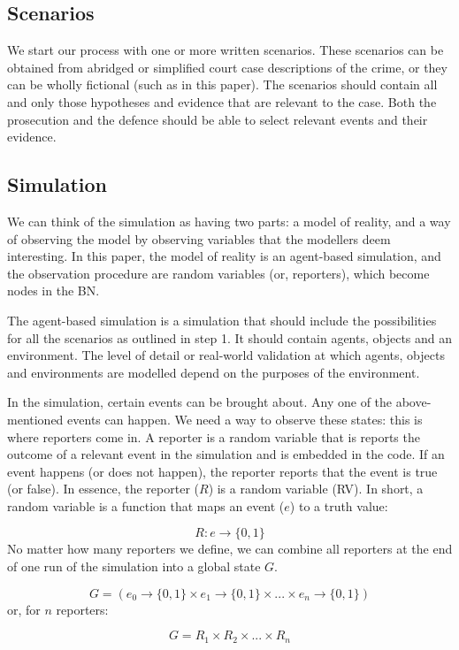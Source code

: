 \documentclass[12pt]{article}
\begin{document}
\subsection{Scenarios}
We start our process with one or more written scenarios. These scenarios can be obtained from abridged or simplified court case descriptions of the crime, or they can be wholly fictional (such as in this paper). The scenarios should contain all and only those hypotheses and evidence that are relevant to the case. Both the prosecution and the defence should be able to select relevant events and their evidence. 

\subsection{Simulation}
We can think of the simulation as having two parts: a model of reality, and a way of observing the model by observing variables that the modellers deem interesting. In this paper, the model of reality is an agent-based simulation, and the observation procedure are random variables (or, reporters), which become nodes in the BN.

The agent-based simulation is a simulation that should include the possibilities for all the scenarios as outlined in step 1. It should contain agents, objects and an environment. The level of detail or real-world validation at which agents, objects and environments are modelled depend on the purposes of the environment.


In the simulation, certain events can be brought about. Any one of the above-mentioned events can happen. We need a way to observe these states: this is where reporters come in. A reporter is a random variable that is reports the outcome of a relevant event in the simulation and is embedded in the code. If an event happens (or does not happen), the reporter reports that the event is true (or false). In essence, the reporter ($R$) is a random variable (RV). In short, a random variable is a function that maps an event ($e$) to a truth value:

\[ R : e \rightarrow \{0, 1\} \]
No matter how many reporters we define, we can combine all reporters at the end of one run of the simulation into a global state $G$.

\[ G = (e_0 \rightarrow \{0, 1\} \times e_1 \rightarrow \{0, 1\} \times ... \times e_n \rightarrow \{0, 1\})\]
 or, for $n$ reporters:
 
\[ G = R_1 \times R_2 \times... \times R_n\]
\end{document}
